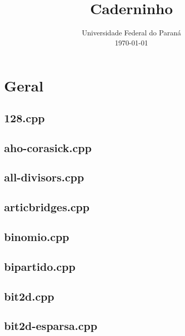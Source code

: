 \documentclass[a4paper,12pt]{article}
\begin{document}
\title{Caderninho}
\date{Universidade Federal do Paraná\\[2ex]\today}


\twocolumn
\tableofcontents

\onecolumn
\pagebreak
\section{Geral}
\subsection{128.cpp}


\subsection{aho-corasick.cpp}


\subsection{all-divisors.cpp}


\subsection{articbridges.cpp}


\subsection{binomio.cpp}


\subsection{bipartido.cpp}


\subsection{bit2d.cpp}


\subsection{bit2d-esparsa.cpp}

\end{document}
